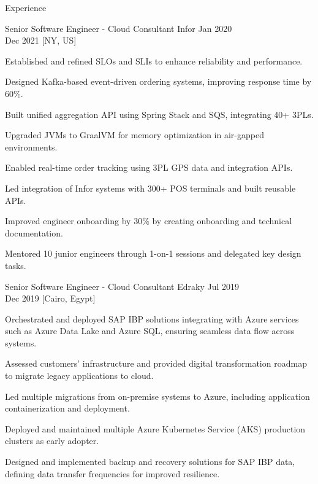 \begin{rSection}{Experience}
    \begin{rSubsection}
        {Senior Software Engineer - Cloud Consultant}
        {Infor}
        {Jan 2020 \\ Dec 2021}
        [NY, US]
        \begin{rItemize}
            \item Established and refined SLOs and SLIs to enhance reliability and performance.
            \item Designed Kafka-based event-driven ordering systems, improving response time by 60\%.
            \item Built unified aggregation API using Spring Stack and SQS, integrating 40+ 3PLs.
            \item Upgraded JVMs to GraalVM for memory optimization in air-gapped environments.
            \item Enabled real-time order tracking using 3PL GPS data and integration APIs.
            \item Led integration of Infor systems with 300+ POS terminals and built reusable APIs.
            \item Improved engineer onboarding by 30\% by creating onboarding and technical documentation.
            \item Mentored 10 junior engineers through 1-on-1 sessions and delegated key design tasks.
        \end{rItemize}
    \end{rSubsection}

    \begin{rSubsection}
        {Senior Software Engineer - Cloud Consultant}
        {Edraky}
        {Jul 2019 \\ Dec 2019}
        [Cairo, Egypt]
        \begin{rItemize}
            \item Orchestrated and deployed SAP IBP solutions integrating with Azure services such as Azure Data Lake and Azure SQL, ensuring seamless data flow across systems.
            \item Assessed customers' infrastructure and provided digital transformation roadmap to migrate legacy applications to cloud.
            \item Led multiple migrations from on-premise systems to Azure, including application containerization and deployment.
            \item Deployed and maintained multiple Azure Kubernetes Service (AKS) production clusters as early adopter.
            \item Designed and implemented backup and recovery solutions for SAP IBP data, defining data transfer frequencies for improved resilience.
        \end{rItemize}
    \end{rSubsection}


\end{rSection}
